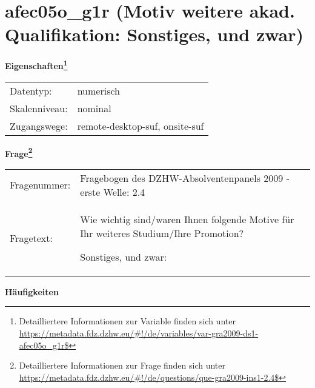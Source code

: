 
    \setcounter{footnote}{0}

    \vspace*{-1.8cm}
	\section{afec05o\_g1r (Motiv weitere akad. Qualifikation: Sonstiges, und zwar)}
	\label{section:afec05o_g1r}



    \vspace*{0.5cm}
    \noindent\textbf{Eigenschaften\footnote{Detailliertere Informationen zur Variable finden sich unter
		\url{https://metadata.fdz.dzhw.eu/\#!/de/variables/var-gra2009-ds1-afec05o_g1r$}}}\\
	\begin{tabularx}{\hsize}{@{}lX}
	Datentyp: & numerisch \\
	Skalenniveau: & nominal \\
	Zugangswege: &
	  remote-desktop-suf, 
	  onsite-suf
 \\
    \end{tabularx}



				\vspace*{0.5cm}
                \noindent\textbf{Frage\footnote{Detailliertere Informationen zur Frage finden sich unter
		              \url{https://metadata.fdz.dzhw.eu/\#!/de/questions/que-gra2009-ins1-2.4$}}}\\
				\begin{tabularx}{\hsize}{@{}lX}
					Fragenummer: &
					  Fragebogen des DZHW-Absolventenpanels 2009 - erste Welle:
					  2.4
 \\
					Fragetext: & Wie wichtig sind/waren Ihnen folgende Motive für Ihr weiteres Studium/Ihre Promotion?\par  Sonstiges, und zwar: \\
				\end{tabularx}





        		\vspace*{0.5cm}
                \noindent\textbf{Häufigkeiten}

